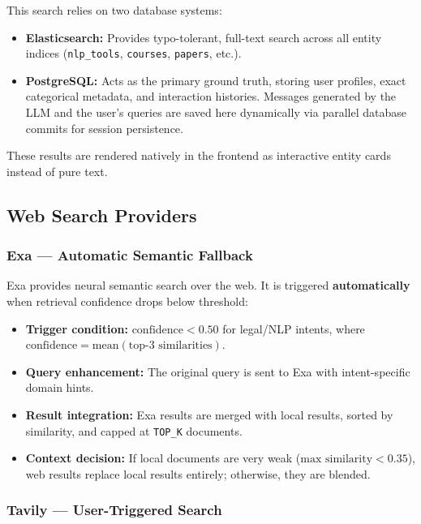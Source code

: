 \documentclass[12pt, a4paper]{article}
\begin{document}
This search relies on two database systems:
\begin{itemize}[leftmargin=2em]
  \item \textbf{Elasticsearch:} Provides typo-tolerant, full-text search across all entity indices (\texttt{nlp\_tools}, \texttt{courses}, \texttt{papers}, etc.).
  \item \textbf{PostgreSQL:} Acts as the primary ground truth, storing user profiles, exact categorical metadata, and interaction histories. Messages generated by the LLM and the user's queries are saved here dynamically via parallel database commits for session persistence.
\end{itemize}
These results are rendered natively in the frontend as interactive entity cards instead of pure text.

\subsection{Web Search Providers}

\subsubsection{Exa --- Automatic Semantic Fallback}

Exa provides neural semantic search over the web. It is triggered
\textbf{automatically} when retrieval confidence drops below threshold:

\begin{itemize}[leftmargin=2em]
  \item \textbf{Trigger condition:} $\text{confidence} < 0.50$ for legal/NLP
        intents, where $\text{confidence} = \text{mean}(\text{top-3 similarities})$.
  \item \textbf{Query enhancement:} The original query is sent to Exa with
        intent-specific domain hints.
  \item \textbf{Result integration:} Exa results are merged with local
        results, sorted by similarity, and capped at \texttt{TOP\_K} documents.
  \item \textbf{Context decision:} If local documents are very weak
        ($\text{max similarity} < 0.35$), web results replace local results
        entirely; otherwise, they are blended.
\end{itemize}

\subsubsection{Tavily --- User-Triggered Search}
\end{document}
